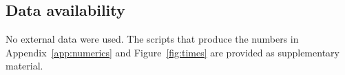 \documentclass[11pt]{amsart}
\numberwithin{equation}{section}
\theoremstyle{definition}
\theoremstyle{remark}
\begin{document}

\subsection*{Data availability}
No external data were used. The scripts that produce the numbers in Appendix~\ref{app:numerics} and
Figure~\ref{fig:times} are provided as supplementary material.
\end{document}
